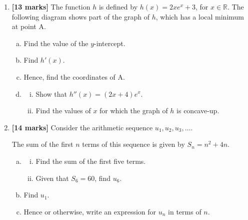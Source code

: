 \documentclass[12pt, twoside]{article}
\begin{document}
\begin{enumerate}
\item \textbf{[13 marks]} The function $h$ is defined by $h(x) = 2xe^x + 3$, for $x \in \mathbb{R}$. The following diagram shows part of the graph of $h$, which has a local minimum at point A.

\begin{center}
\end{center}

    \begin{enumerate}[(a)]
        \item Find the value of the $y$-intercept.
        \item Find $h'(x)$.
        \item Hence, find the coordinates of A.
        \item \begin{enumerate}[(i)]
            \item Show that $h''(x) = (2x + 4)e^x$.
            \item Find the values of $x$ for which the graph of $h$ is concave-up.
        \end{enumerate}
    \end{enumerate}

\vspace{1cm}

\item \textbf{[14 marks]} Consider the arithmetic sequence $u_1, u_2, u_3, \ldots$.

The sum of the first $n$ terms of this sequence is given by $S_n = n^2 + 4n$.

    \begin{enumerate}[(a)]
        \item \begin{enumerate}[(i)]
            \item Find the sum of the first five terms.
            \item Given that $S_6 = 60$, find $u_6$.
        \end{enumerate}
        \item Find $u_1$.
        \item Hence or otherwise, write an expression for $u_n$ in terms of $n$.
    \end{enumerate}
    

\end{enumerate}
\end{document}
